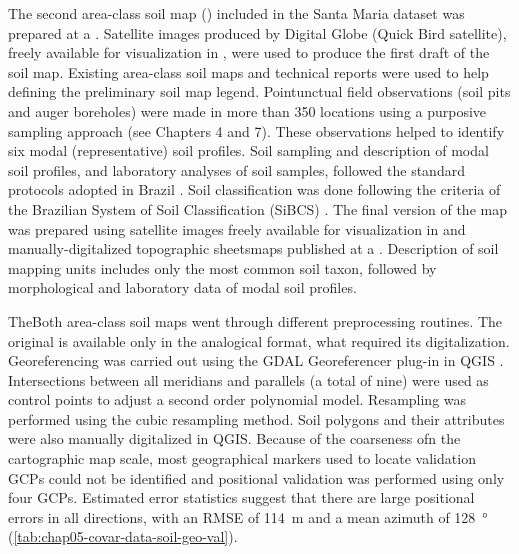 The second area-class soil map (\soilNew) included in the Santa Maria dataset \cite{Miguel2010} was prepared 
at a . Satellite images produced by Digital Globe\textregistered{} (Quick Bird satellite), freely 
available for visualization in \googleearth, were used to produce the first draft of the soil 
map. Existing area-class soil maps and technical reports \cite{Pedron2005, Poelking2007, Sturmer2008} were 
used to help defining the preliminary soil map legend. Pointunctual field observations (soil pits and auger 
boreholes) were made in 
more than \num{350} locations using a purposive sampling approach (see Chapters 4 and 7). These observations 
helped to identify six 
modal (representative) soil profiles. Soil sampling and description of modal soil profiles, and laboratory 
analyses of soil samples, followed the standard protocols adopted in Brazil \cite{ClaessenEtAl1997, 
SantosEtAl2005}. Soil classification was done following the criteria of the Brazilian System of Soil 
Classification (SiBCS) \cite{SantosEtAl2006}. The final version of the map was prepared using satellite images 
freely available for visualization in \googleearth{} and manually-digitalized topographic sheetsmaps 
published at a  \cite{DSG1992a, DSG1992}. Description of soil mapping units includes only the 
most common soil taxon, followed by morphological and laboratory data of modal soil profiles.

TheBoth area-class soil maps went through different preprocessing routines. The original \soilOld{} is 
available 
only in the analogical format, what required its digitalization. Georeferencing was carried out using the GDAL 
Georeferencer plug-in in QGIS \cite{GDAL2013, QGIS2013}. Intersections between all meridians and parallels (a 
total of nine) were used as control points to adjust a second order polynomial model. Resampling was performed 
using the cubic resampling method. Soil polygons and their attributes were also manually digitalized in QGIS. 
Because of the coarseness ofn the cartographic map scale, most geographical markers used to locate validation 
GCPs could not be identified and positional validation was performed using only four GCPs. Estimated error 
statistics suggest that there are large positional errors in all directions, with an RMSE of \SI{114}{\m} and 
a mean azimuth of \SI{128}{\degree} (\autoref{tab:chap05-covar-data-soil-geo-val}).

